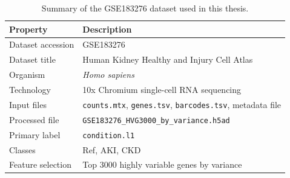 \begin{table}[H]
\centering
\caption{Summary of the GSE183276 dataset used in this thesis.}
\label{tab:dataset_summary}
\begin{tabularx}{\textwidth}{lX}
\toprule
Property & Description \\
\midrule
Dataset accession & GSE183276 \\
Dataset title & Human Kidney Healthy and Injury Cell Atlas \\
Organism & \textit{Homo sapiens} \\
Technology & 10x Chromium single-cell RNA sequencing \\
Input files & \texttt{counts.mtx}, \texttt{genes.tsv}, \texttt{barcodes.tsv}, metadata file \\
Processed file & \texttt{GSE183276\_HVG3000\_by\_variance.h5ad} \\
Primary label & \texttt{condition.l1} \\
Classes & Ref, AKI, CKD \\
Feature selection & Top 3000 highly variable genes by variance \\
\bottomrule
\end{tabularx}
\end{table}
